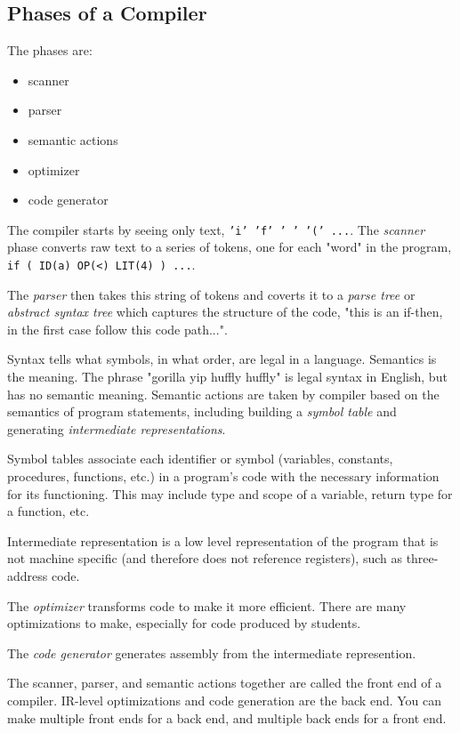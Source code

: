 \subsection{Phases of a Compiler}

The phases are:
\begin{itemize}
    \item scanner
    \item parser 
    \item semantic actions
    \item optimizer
    \item code generator
\end{itemize}

The compiler starts by seeing only text,
\texttt{'i' 'f' ' ' '(' ...}. The \emph{scanner}
phase converts raw text to a series of tokens, 
one for each "word" in the program, 
\texttt{if ( ID(a) OP(<) LIT(4) ) ...}.

The \emph{parser} then takes this string of 
tokens and coverts it to a \emph{parse tree} or 
\emph{abstract syntax tree} which captures the 
structure of the code, "this is an if-then, 
in the first case follow this code path...". 

Syntax tells what symbols, in what order, 
are legal in a language. Semantics 
is the meaning. The phrase "gorilla yip 
huffly huffly" is legal syntax in 
English, but has no semantic meaning. 
Semantic actions are taken by compiler 
based on the semantics of program statements,
including building a \emph{symbol table} and
generating \emph{intermediate representations}.

Symbol tables associate each identifier or 
symbol (variables, constants, 
procedures, functions, etc.) in a program's 
code with the necessary information for its 
functioning. This may include type and scope of a variable,
return type for a function, etc. 

Intermediate representation is a
low level representation of the program that 
is not machine specific (and therefore does 
not reference registers), such as 
three-address code. 

The \emph{optimizer} transforms code to make 
it more efficient. There are many optimizations 
to make, especially for code produced by students. 

The \emph{code generator} generates assembly from 
the intermediate represention. 

The scanner, parser, and semantic actions 
together are called the front end of a compiler. 
IR-level optimizations and code generation are the 
back end. You can make multiple front ends for a 
back end, and multiple back ends for a front end. 